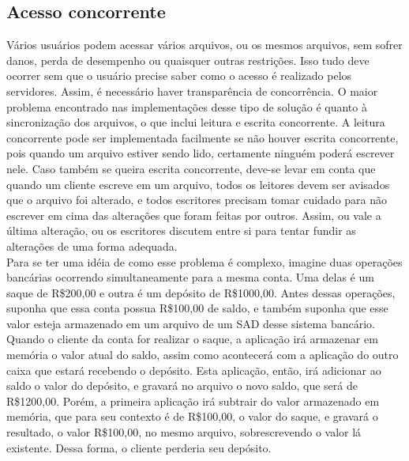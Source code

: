 	\subsection{Acesso concorrente}
	Vários usuários podem acessar vários arquivos, ou os mesmos arquivos, sem sofrer danos, perda de desempenho ou quaisquer outras restrições. Isso tudo deve ocorrer sem que o usuário precise saber como o acesso é realizado pelos servidores. Assim, é necessário haver transparência de concorrência.
	O maior problema encontrado nas implementações desse tipo de solução é quanto à sincronização dos arquivos, o que inclui leitura e escrita concorrente. A leitura concorrente pode ser implementada facilmente se não houver escrita concorrente, pois quando um arquivo estiver sendo lido, certamente ninguém poderá escrever nele. 
	Caso também se queira escrita concorrente, deve-se levar em conta que quando um cliente escreve em um arquivo, todos os leitores devem ser avisados que o arquivo foi alterado, e todos escritores precisam tomar cuidado para não escrever em cima das alterações que foram feitas por outros.
	Assim, ou vale a última alteração, ou os escritores discutem entre si para tentar fundir as alterações de uma forma adequada.
	\\
	
	Para se ter uma idéia de como esse problema é complexo, imagine duas operações bancárias ocorrendo simultaneamente para a mesma conta. Uma delas é um saque de R\$200,00 e outra é um depósito de R\$1000,00. Antes dessas operações, suponha que essa conta possua R\$100,00 de saldo, e também suponha que esse valor esteja armazenado em um arquivo de um SAD desse sistema bancário. Quando o cliente da conta for realizar o saque, a aplicação irá armazenar em memória o valor atual do saldo, assim como acontecerá com a aplicação do outro caixa que estará recebendo o depósito. Esta aplicação, então, irá adicionar ao saldo o valor do depósito, e gravará no arquivo o novo saldo, que será de R\$1200,00. Porém, a primeira aplicação irá subtrair do valor armazenado em memória, que para seu contexto é de R\$100,00, o valor do saque, e gravará o resultado, o valor R\$100,00, no mesmo arquivo, sobrescrevendo o valor lá existente. Dessa forma, o cliente perderia seu depósito.\\
	
